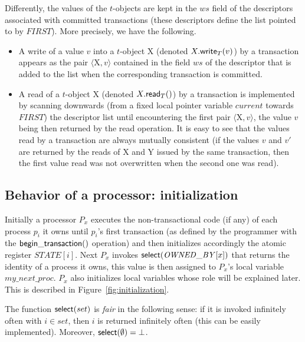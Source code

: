 Differently, the  values of the $t$-objects are kept in the $ws$ field 
of the  descriptors associated with committed transactions
(these descriptors define the list pointed to by $\mathit{FIRST}$). 
More precisely,  we have the following.
\begin{itemize}
\item
A  write of a value $v$ into a $t$-object {\sc X} (denoted $X.{\sf write}_T(v)$) by a transaction 
appears as the  pair  $\langle${\sc X}$,v \rangle$ contained in the 
field $ws$ of the descriptor  that is added to the list when the
corresponding transaction is committed. 
\item
A read of a $t$-object {\sc X} (denoted $X.{\sf read}_T()$) by a transaction is implemented by 
scanning  downwards (from a fixed local pointer variable $current$ towards $\mathit{FIRST}$)
the  descriptor list until encountering 
the first pair $\langle${\sc X}$,v \rangle$, the value $v$ being then 
returned by the read operation. It is easy to see that the values read by a 
transaction are always mutually consistent (if the values $v$ and $v'$ are 
returned by the reads of {\sc X} and {\sc Y} issued by the same transaction, 
then the first  value read  was not overwritten when the second one was read). 
\end{itemize}


\subsection{Behavior of a processor: initialization}
Initially a   processor $P_x$ executes the non-transactional  code (if any)
of each process $p_i$ it owns  
until $p_i$'s first transaction (as defined by the programmer with the
${\sf begin\_transaction}()$ operation) and then 
initializes accordingly the  atomic register
$\mathit{STATE}[i]$. 
Next  $P_x$ invokes  ${\sf select}(\mathit{OWNED\_BY}[x])$
that returns the identity of a process it owns, this value is then assigned
to $P_x$'s local  
variable  $my\_next\_proc$. $P_x$ also initializes local variables
whose role  will be explained later.
This is described in Figure~\ref{fig:initialization}. 


The function ${\sf select}(set)$ is {\it fair} in the following sense:
if it is invoked infinitely often with $i\in set$,  then $i$ is returned
infinitely often (this can be easily implemented).
Moreover, ${\sf select}(\emptyset)=\bot$.  



